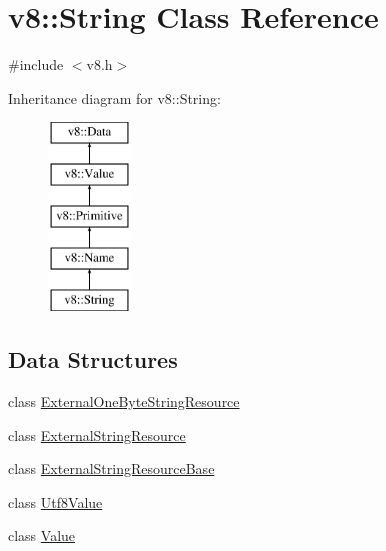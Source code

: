 \hypertarget{classv8_1_1String}{}\section{v8\+:\+:String Class Reference}
\label{classv8_1_1String}


{\ttfamily \#include $<$v8.\+h$>$}

Inheritance diagram for v8\+:\+:String\+:\begin{figure}[H]
\begin{center}
\leavevmode
\includegraphics[height=5.000000cm]{classv8_1_1String}
\end{center}
\end{figure}
\subsection*{Data Structures}
\begin{DoxyCompactItemize}
\item 
class \hyperlink{classv8_1_1String_1_1ExternalOneByteStringResource}{External\+One\+Byte\+String\+Resource}
\item 
class \hyperlink{classv8_1_1String_1_1ExternalStringResource}{External\+String\+Resource}
\item 
class \hyperlink{classv8_1_1String_1_1ExternalStringResourceBase}{External\+String\+Resource\+Base}
\item 
class \hyperlink{classv8_1_1String_1_1Utf8Value}{Utf8\+Value}
\item 
class \hyperlink{classv8_1_1String_1_1Value}{Value}
\end{DoxyCompactItemize}
